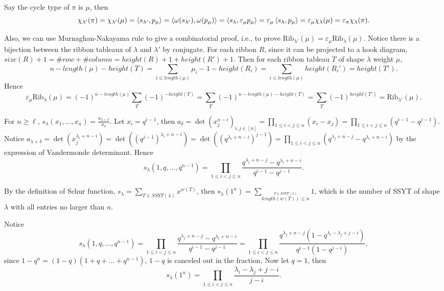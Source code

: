 \documentclass{myhw}
\newcommand{\rib}{\text{Rib}}
\begin{document}
\begin{homeworkProblem}
Say the cycle type of $\pi$ is $\mu$, then
\[
  \chi_{\lambda'}(\pi)=\chi_{\lambda'}(\mu)=\braket{s_{\lambda'},p_\mu}=\braket{\omega(s_{\lambda'}), \omega(p_\mu)}=\braket{s_\lambda, \varepsilon_\mu p_\mu}=\varepsilon_\mu \braket{s_\lambda,p_\mu}=\varepsilon_\mu\chi_\lambda(\mu)=\varepsilon_\pi\chi_\lambda(\pi).
\]

Also, we can use Murnaghan-Nakayama rule to give a combinatorial proof, i.e., to prove $\rib_{\lambda'}(\mu)=\varepsilon_\mu\rib_\lambda(\mu)$. Notice there is a bijection between the ribbon tableaux of $\lambda$ and $\lambda'$ by conjugate. For each ribbon $R$, since it can be projected to a hook diagram, $size(R) + 1 = \#row + \#column = height(R)+1 + height(R')+1$. Then for each ribbon tableau $T$ of shape $\lambda$ weight $\mu$, \[
  n-length(\mu)-height(T)=\sum_{i \leq length(\mu)}\mu_i-1-height(R_i)=\sum_{i \leq length(\mu)}height(R_i')=height(T').
\] Hence \[
  \varepsilon_\mu\rib_\lambda(\mu)=(-1)^{n-length(\mu)}\sum_T (-1)^{-height(T)}=\sum_T(-1)^{n-length(\mu)-height(T)}=\sum_T (-1)^{height(T')}=\rib_{\lambda'}(\mu).
\]
\end{homeworkProblem}
\begin{homeworkProblem}
\begin{homeworkSection}
For $n \geq \ell$, $s_\lambda(x_1, \ldots, x_n)=\frac{a_{\lambda+\delta}}{a_\delta}$. Let $x_i=q^{i-1}$, then $a_\delta=\det(x_j^{n-i})_{i,j \in [n]}=\prod_{1 \leq i<j \leq n}(x_i-x_j)=\prod_{1 \leq i<j \leq n}(q^{i-1}-q^{j-1})$. Notice $a_{\lambda+\delta}=\det(x_j^{\lambda_i+n-i})=\det((q^{j-1})^{\lambda_i+n-i})=\det((q^{\lambda_i+n-i})^{j-1})=\prod_{1 \leq i<j \leq n}(q^{\lambda_j+n-j} - q^{\lambda_i+n-i})$ by the expression of Vandermonde determinant. Hence \[
  s_\lambda(1,q,\ldots,q^{n-1})=\prod_{1 \leq i<j \leq n}\frac{q^{\lambda_j+n-j} - q^{\lambda_i+n-i}}{q^{i-1}-q^{j-1}}.
\]
\end{homeworkSection}
\begin{homeworkSection}
By the definition of Schur function, $s_\lambda=\sum _{T \in SSYT(\lambda)} x ^{w(T)}$, then $s_\lambda(1^n)=\sum_{\stackrel{T \in SSYT(\lambda)}{length(w(T)) \leq n}} 1$, which is the number of SSYT of shape $\lambda$ with all entries no larger than $n$.

Notice \[
  s_\lambda(1,q,\ldots,q^{n-1})=\prod_{1 \leq i<j \leq n}\frac{q^{\lambda_j+n-j} - q^{\lambda_i+n-i}}{q^{i-1}-q^{j-1}}=\prod_{1 \leq i<j \leq n} \frac{q^{\lambda_j+n-j}(1-q^{\lambda_i- \lambda_j+j-i})}{q^{i-1}(1-q^{j-i})},
\]
since $1-q^n=(1-q)(1+q+\ldots+q^{n-1})$, $1-q$ is canceled out in the fraction, Now let $q=1$, then \[
  s_\lambda(1^n)=\prod_{1 \leq i<j \leq n}\frac{\lambda_i- \lambda_j+j-i}{j-i}.
\]
\end{homeworkSection}
\end{homeworkProblem}
\end{document}
